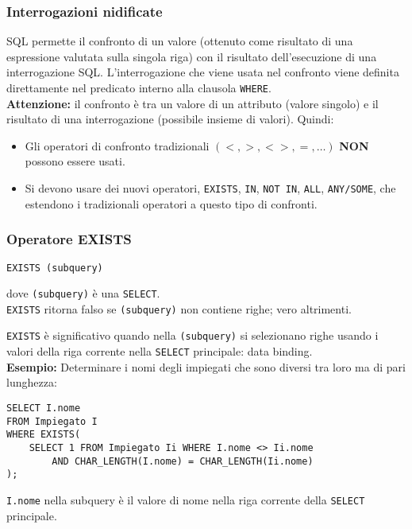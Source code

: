 \documentclass[a4paper, 10pt, titlepage]{article}
\begin{document}
	\subsubsection{Interrogazioni nidificate}
		SQL permette il confronto di un valore (ottenuto come risultato di una
		espressione valutata sulla singola riga) con il risultato dell’esecuzione di
		una interrogazione SQL. L’interrogazione che viene usata nel confronto viene definita
		direttamente nel predicato interno alla clausola \lstinline|WHERE|. \\
		\textbf{Attenzione: }il confronto è tra un valore di un attributo (valore singolo) e
		il risultato di una interrogazione (possibile insieme di valori). Quindi:
		\begin{itemize}
				\item Gli operatori di confronto tradizionali $ (<, >, <>, =, \dots) $ \textbf{NON} possono	essere usati.
				\item Si devono usare dei nuovi operatori, \lstinline|EXISTS|, \lstinline|IN|, 
				\lstinline|NOT IN|, \lstinline|ALL|, \lstinline|ANY/SOME|, che estendono i tradizionali
				operatori a questo tipo di confronti.
			\end{itemize}
			
	\subsubsection{Operatore EXISTS}
		\begin{lstlisting}
EXISTS (subquery)
		\end{lstlisting}
			dove \lstinline|(subquery)| è una \lstinline|SELECT|.\\
			\lstinline|EXISTS| ritorna falso se \lstinline|(subquery)| non contiene righe; vero altrimenti.
			
			\noindent
			\lstinline|EXISTS| è significativo quando nella \lstinline|(subquery)| si selezionano righe
			usando i valori della riga corrente nella \lstinline|SELECT| principale: data binding. \\
			\textbf{Esempio:} Determinare i nomi degli impiegati che sono diversi tra loro ma di pari lunghezza:
			\begin{lstlisting}[tabsize=4]
SELECT I.nome
FROM Impiegato I
WHERE EXISTS(
    SELECT 1 FROM Impiegato Ii WHERE I.nome <> Ii.nome
		AND CHAR_LENGTH(I.nome) = CHAR_LENGTH(Ii.nome)
);
			\end{lstlisting}
			\lstinline|I.nome| nella subquery è il valore di nome nella riga corrente della \lstinline|SELECT| principale.
			
\end{document}
